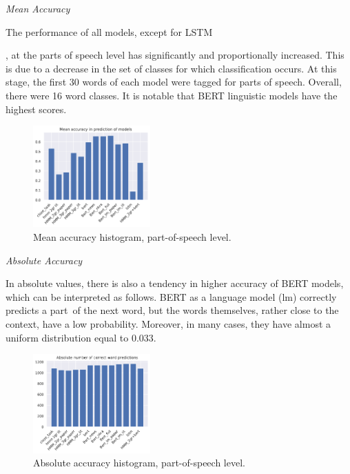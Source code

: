 \documentclass[a4paper]{article}
\newcommand{\head}[1]{\vspace{0.5em}\emph{#1}\vspace{0.25em}}
\begin{document}
\head{Mean Accuracy}

The performance of all models, except for LSTM


, at the parts of speech level has significantly and proportionally increased. This is due to a decrease in the set of classes for which classification occurs. At this stage, the first 30 words of each model were tagged for parts of speech. Overall, there were 16 word classes. It is notable that BERT linguistic models have the highest scores.

\begin{figure}
\caption{Mean accuracy histogram, part-of-speech level.}
\label{fig:mean-accuracy-hist-pos}
\centering
\includegraphics[width=0.4\textwidth]{figures/pdf/mean-accuracy-hist-pos.pdf}
\end{figure}



\head{Absolute Accuracy}

In absolute values, there is also a tendency in higher accuracy of BERT models, which can be interpreted as follows. BERT as a language model (lm) correctly predicts a part of the next word, but the words themselves, rather close to the context, have a low probability. Moreover, in many cases, they have almost a uniform distribution equal to 0.033.

\begin{figure}
\caption{Absolute accuracy histogram, part-of-speech level.}
\label{fig:abs-accuracy-hist-pos}
\centering
\includegraphics[width=0.4\textwidth]{figures/pdf/abs-accuracy-hist-pos.pdf}
\end{figure}
\end{document}
